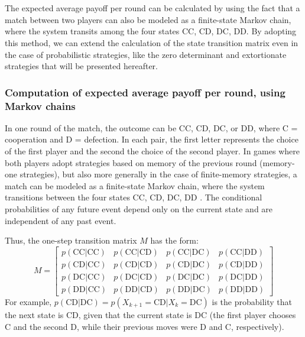 \documentclass[12pt]{report}
\begin{document}
\\\\
The expected average payoff per round can be calculated by using the fact that a match between two players can also be modeled as a finite-state Markov chain, where the system transits among the four states CC, CD, DC, DD. By adopting  this method, we can extend the calculation of the state transition matrix even in the case of probabilistic strategies, like the zero determinant and extortionate strategies that will be presented hereafter.








\subsubsection{Computation of expected average payoff per round, using Markov chains}\label{expected}
In one round of the match, the outcome can be CC, CD, DC, or DD, where C = cooperation and D = defection. In each pair, the first letter represents the choice of the first player and the second the choice of the second player. In games where both players adopt strategies based on memory of the previous round (memory-one strategies), but also more generally in the case of finite-memory strategies, a match can be modeled as a finite-state Markov chain, where the system transitions between the four states CC, CD, DC, DD \cite{hillier2020}. The conditional probabilities of any future event depend only on the current state and are independent of any past event.

Thus, the one-step transition matrix \( M \) has the form:
\[
M =
\begin{bmatrix}
p(\text{CC}|\text{CC}) & p(\text{CC}|\text{CD}) & p(\text{CC}|\text{DC}) & p(\text{CC}|\text{DD}) \\
p(\text{CD}|\text{CC}) & p(\text{CD}|\text{CD}) & p(\text{CD}|\text{DC}) & p(\text{CD}|\text{DD}) \\
p(\text{DC}|\text{CC}) & p(\text{DC}|\text{CD}) & p(\text{DC}|\text{DC}) & p(\text{DC}|\text{DD}) \\
p(\text{DD}|\text{CC}) & p(\text{DD}|\text{CD}) & p(\text{DD}|\text{DC}) & p(\text{DD}|\text{DD})
\end{bmatrix}
\]
For example, \( p(\text{CD}|\text{DC}) = p(X_{k+1} = \text{CD} | X_k = \text{DC}) \) is the probability that the next state is CD, given that the current state is DC (the first player chooses C and the second D, while their previous moves were D and C, respectively).
\end{document}
